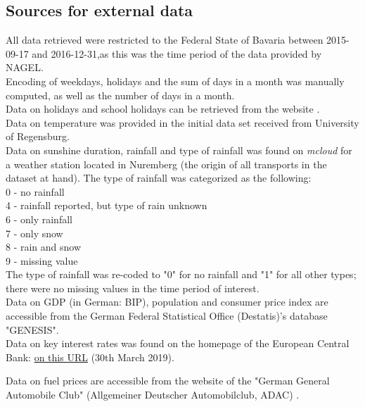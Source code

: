 \documentclass[a4paper, 11pt]{article}
\begin{document}
\subsection{Sources for external data}

All data retrieved were restricted to the Federal State of Bavaria between 2015-09-17 and 2016-12-31,as this was the time period of the data provided by NAGEL.\\

Encoding of weekdays, holidays and the sum of days in a month was manually computed, as well as the number of days in a month.\\
Data on holidays and school holidays can be retrieved from the website \href{schulferien.org} \citep{.b}.\\

Data on temperature was provided in the initial data set received from University of Regensburg.\\
Data on sunshine duration, rainfall and type of rainfall was found on \textit{mcloud} for a weather station located in Nuremberg (the origin of all transports in the dataset at hand). The type of rainfall was categorized as the following:\\
0 - no rainfall\\
4 - rainfall reported, but type of rain unknown\\
6 - only rainfall \\
7 - only snow\\
8 - rain and snow\\
9 - missing value\\
The type of rainfall was re-coded to "0" for no rainfall and "1" for all other types; there were no missing values in the time period of interest.\\

Data on GDP (in German: BIP), population and consumer price index are accessible from the German Federal Statistical Office (Destatis)'s database "GENESIS".\\
Data on key interest rates was found on the homepage of the European Central Bank: \href{http://sdw.ecb.europa.eu/quickview.do?SERIES_KEY=143.FM.D.U2.EUR.4F.KR.DFR.LEV&start=01-01-2015&end=31-12-2016&submitOptions.x=0&submitOptions.y=0&trans=N}{on this URL} (30th March 2019).

Data on fuel prices are accessible from the website of the "German General Automobile Club" (Allgemeiner Deutscher Automobilclub, ADAC) \citep{ADAC.}.\\
\end{document}

